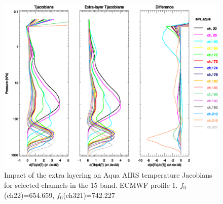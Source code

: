 \begin{figure}[htp]
  \centering
  \includegraphics[scale=0.8]{graphics/airs_aqua.t_k_el.p1.eps}
  \caption{Impact of the extra layering on Aqua AIRS temperature Jacobians for selected channels in the 15\micron{} \carbondioxide{} band. ECMWF profile 1. $f_{0}$(ch22)=654.659\invcm, $f_{0}$(ch321)=742.227\invcm }
  \label{fig:airs_aqua.t_k_el.p1}
\end{figure}


